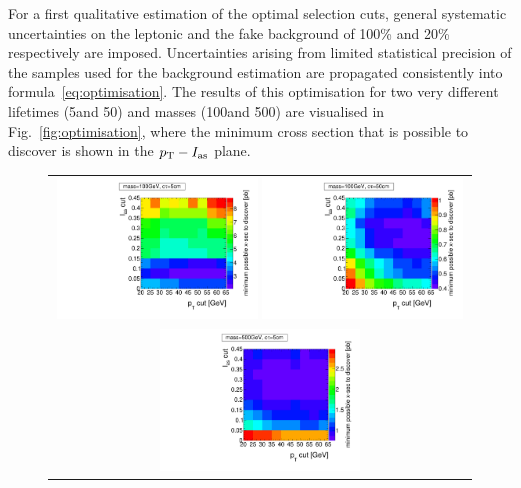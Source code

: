 For a first qualitative estimation of the optimal selection cuts, general systematic uncertainties on the leptonic and the fake background of 100\% and 20\% respectively are imposed.
Uncertainties arising from limited statistical precision of the samples used for the background estimation are propagated consistently into formula~\ref{eq:optimisation}.
The results of this optimisation for two very different lifetimes (5\cm and 50\cm) and masses (100\gev and 500\gev) are visualised in Fig.~\ref{fig:optimisation}, where the minimum cross section that is possible to discover is shown in the $p_{\text{T}}-I_{\text{as}}$ plane.
\begin{figure}[!h]
  \centering 
  \vspace{30pt}
  \begin{tabular}{c}
    \includegraphics[width=0.49\textwidth]{figures/analysis/Optimisation/Madgraph_signal_mass_100_ctau_5cm_ECaloLe5_SOverDeltaBStatPlusSys.pdf} 
    \includegraphics[width=0.49\textwidth]{figures/analysis/Optimisation/Madgraph_signal_mass_100_ctau_50cm_ECaloLe5_SOverDeltaBStatPlusSys.pdf}\\ 
    \includegraphics[width=0.49\textwidth]{figures/analysis/Optimisation/Madgraph_signal_mass_500_ctau_5cm_ECaloLe5_SOverDeltaBStatPlusSys.pdf}

\end{tabular}
\end{figure}
